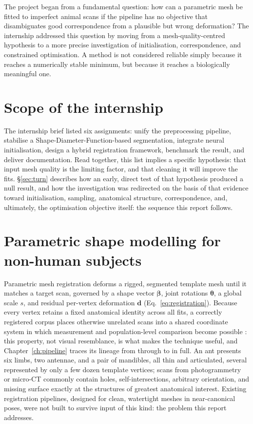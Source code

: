 The project began from a fundamental question: how can a parametric
mesh be fitted to imperfect animal scans if the pipeline has no objective that
disambiguates good correspondence from a plausible but wrong deformation? The
internship addressed this question by moving from a mesh-quality-centred
hypothesis to a more precise investigation of initialisation, correspondence,
and constrained optimisation. A method is not considered reliable simply
because it reaches a numerically stable minimum, but because it reaches a
biologically meaningful one.

\section{Scope of the internship}

The internship brief listed six assignments: unify the preprocessing
pipeline, stabilise a Shape-Diameter-Function-based segmentation, integrate
neural initialisation, design a hybrid registration framework, benchmark the
result, and deliver documentation. Read together, this list implies a
specific hypothesis: that input mesh quality is the limiting factor, and
that cleaning it will improve the fits.
\S\ref{sec:turn} describes how an early, direct test of that hypothesis
produced a null result, and how the investigation was redirected on the
basis of that evidence toward initialisation, sampling, anatomical
structure, correspondence, and, ultimately, the optimisation objective
itself: the sequence this report follows.

\section{Parametric shape modelling for non-human subjects}

Parametric mesh registration deforms a rigged, segmented template mesh until
it matches a target scan, governed by a shape vector $\bm\beta$, joint
rotations $\bm\theta$, a global scale $s$, and residual per-vertex
deformation $\mathbf d$ (Eq.~\ref{eq:registration}). Because every
vertex retains a fixed anatomical identity across all fits, a correctly
registered corpus places otherwise unrelated scans into a shared coordinate
system in which measurement and population-level comparison become possible
: this property, not visual resemblance, is what makes the technique
useful, and Chapter~\ref{ch:pipeline} traces its lineage from 
through  to  in full. An ant presents six limbs,
two antennae, and a pair of mandibles, all thin and articulated, several
represented by only a few dozen template vertices; scans from 
photogrammetry~\cite{scant} or micro-CT commonly contain holes,
self-intersections, arbitrary orientation, and missing surface exactly at
the structures of greatest anatomical interest. Existing registration
pipelines, designed for clean, watertight meshes in near-canonical poses,
were not built to survive input of this kind: the problem this report
addresses.

